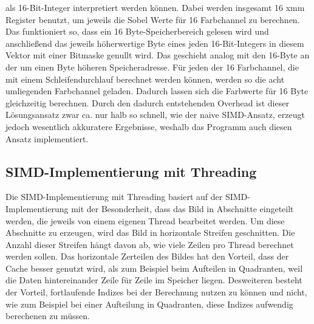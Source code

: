 \documentclass[course=erap]{aspdoc}
\begin{document}
als 16-Bit-Integer interpretiert werden können.
Dabei werden insgesamt 16 xmm Register benutzt, um jeweils die Sobel Werte für 16 Farbchannel zu berechnen.
Das funktioniert so, dass ein 16 Byte-Speicherbereich gelesen wird und anschließend das jeweils höherwertige Byte eines jeden
16-Bit-Integers in diesem Vektor mit einer Bitmaske genullt wird. Das geschieht analog mit den 16-Byte an der um einen Byte höheren Speicheradresse.
Für jeden der 16 Farbchannel, die mit einem Schleifendurchlauf berechnet werden können, werden so die acht umliegenden
Farbchannel geladen. Dadurch lassen sich die Farbwerte für 16 Byte gleichzeitig berechnen. Durch den dadurch entstehenden Overhead
ist dieser Lösungsansatz zwar ca. nur halb so schnell, wie der naive SIMD-Ansatz, erzeugt jedoch wesentlich
akkuratere Ergebnisse, weshalb das Programm auch diesen Ansatz implementiert.

\subsection{SIMD-Implementierung mit Threading}
\label{sec:simd-threading}
Die SIMD-Implementierung mit Threading basiert auf der SIMD-Implementierung mit der Besonderheit, dass das Bild in Abschnitte eingeteilt werden, die jeweils von einem eigenen Thread bearbeitet werden.
Um diese Abschnitte zu erzeugen, wird das Bild in horizontale Streifen geschnitten. Die Anzahl dieser Streifen hängt davon ab, wie viele Zeilen pro Thread berechnet werden sollen.
Das horizontale Zerteilen des Bildes hat den Vorteil, dass der Cache besser genutzt wird, als zum Beispiel beim Aufteilen in Quadranten, weil die Daten hintereinander Zeile für Zeile im Speicher liegen.
Desweiteren besteht der Vorteil, fortlaufende Indizes bei der Berechnung nutzen zu können und nicht, wie zum Beispiel bei einer Aufteilung in Quadranten, diese Indizes aufwendig berechenen zu müssen.
\end{document}
